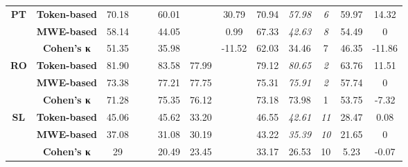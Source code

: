 \documentclass[output=paper,modfonts,nonflat,draftmode]{langsci/langscibook}
\begin{document}
\begin{table}
{\begin{tabular}{ccccccccccccc}
\textbf{\scriptsize{}PT} & \textbf{\scriptsize{}Token-based} & {\scriptsize{}70.18} &  &  & {\scriptsize{}60.01} &  & {\scriptsize{}30.79} & {\scriptsize{}70.94} & \emph{\scriptsize{}57.98} & \textit{\scriptsize{}6} & {\scriptsize{}59.97} & {\scriptsize{}14.32}\tabularnewline
 & \textbf{\scriptsize{}MWE-based} & {\scriptsize{}58.14} &  &  & {\scriptsize{}44.05} &  & {\scriptsize{}0.99} & {\scriptsize{}67.33} & \emph{\scriptsize{}42.63} & \textit{\scriptsize{}8} & {\scriptsize{}54.49} & {\scriptsize{}0}\tabularnewline
   & \textbf{\scriptsize{}Cohen's κ} &\scriptsize{51.35}  &\scriptsize{}  &\scriptsize{}  & \scriptsize{35.98} &\scriptsize{}  &\scriptsize{-11.52}  &\scriptsize{62.03} &\scriptsize{34.46}  &\scriptsize{7} & \scriptsize{46.35} &\scriptsize{-11.86}  \tabularnewline
\midrule 

\textbf{\scriptsize{}RO} & \textbf{\scriptsize{}Token-based} & {\scriptsize{}81.90} &  &  & {\scriptsize{}83.58} & {\scriptsize{}77.99} &  & {\scriptsize{}79.12} & \emph{\scriptsize{}80.65} & \textit{\scriptsize{}2} & {\scriptsize{}63.76} & {\scriptsize{}11.51}\tabularnewline
 & \textbf{\scriptsize{}MWE-based} & {\scriptsize{}73.38} &  &  & {\scriptsize{}77.21} & {\scriptsize{}77.75} &  & {\scriptsize{}75.31} & \emph{\scriptsize{}75.91} & \textit{\scriptsize{}2} & {\scriptsize{}57.74} & {\scriptsize{}0}\tabularnewline
   & \textbf{\scriptsize{}Cohen's κ} &\scriptsize{71.28}  &\scriptsize{}  &\scriptsize{}  & \scriptsize{75.35} &\scriptsize{76.12}  &\scriptsize{}  &\scriptsize{73.18} &\scriptsize{73.98}  &\scriptsize{1} & \scriptsize{53.75} &\scriptsize{-7.32}  \tabularnewline
\midrule 

\textbf{\scriptsize{}SL} & \textbf{\scriptsize{}Token-based} & {\scriptsize{}45.06} &  &  & {\scriptsize{}45.62} & {\scriptsize{}33.20} &  & {\scriptsize{}46.55} & \emph{\scriptsize{}42.61} & \textit{\scriptsize{}11} & {\scriptsize{}28.47} & {\scriptsize{}0.08}\tabularnewline
 & \textbf{\scriptsize{}MWE-based} & {\scriptsize{}37.08} &  &  & {\scriptsize{}31.08} & {\scriptsize{}30.19} &  & {\scriptsize{}43.22} & \emph{\scriptsize{}35.39} & \textit{\scriptsize{}10} & {\scriptsize{}21.65} & {\scriptsize{}0}\tabularnewline
   & \textbf{\scriptsize{}Cohen's κ} &\scriptsize{29}  &\scriptsize{}  &\scriptsize{}  & \scriptsize{20.49} &\scriptsize{23.45}  &\scriptsize{}  &\scriptsize{33.17} &\scriptsize{26.53}  &\scriptsize{10} & \scriptsize{5.23} &\scriptsize{-0.07}  \tabularnewline
\midrule 


\end{tabular}}
\end{table}
\end{document}
